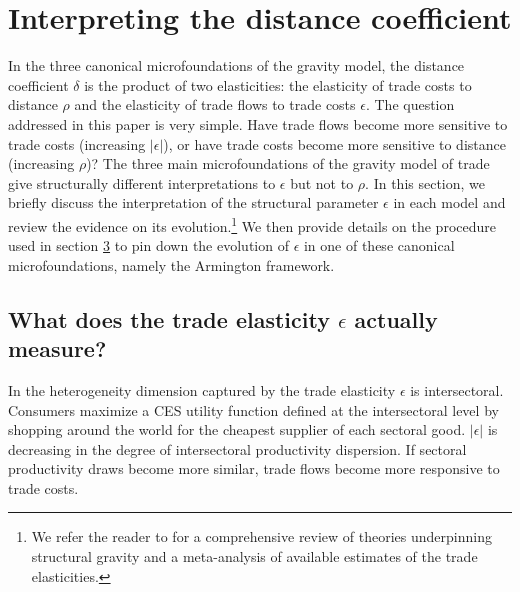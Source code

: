 \documentclass[12pt,twoside,a4paper,notitlepage]{article}
\begin{document}

\section{Interpreting the distance coefficient}
In the three canonical microfoundations of the gravity model, the distance coefficient $\delta $ is the product of two elasticities: the elasticity of trade costs to distance $ \rho $ and the elasticity of trade flows to trade costs $ \epsilon $.
The question addressed in this paper is very simple.
Have trade flows become more sensitive to trade costs (increasing $ |\epsilon| $), or have trade costs become more sensitive to distance (increasing $\rho$)? 
The three main microfoundations of the gravity model of trade give structurally different interpretations to $ \epsilon $ but not to $ \rho $. 
In this section, we briefly discuss the interpretation of the structural parameter $ \epsilon $ in each model and review the evidence on its evolution.\footnote{We refer the reader to \cite{Head2014} for a comprehensive review of theories underpinning structural gravity and a meta-analysis of available estimates of the trade elasticities.} 
We then provide details on the procedure used in section {\hyperref[ref-003]{3}} to pin down the evolution of $ \epsilon $ in one of these canonical microfoundations, namely the Armington framework. 

\subsection{What does the trade elasticity $ \epsilon $ actually measure? }

In \cite{Eaton2002} the heterogeneity dimension captured by the trade elasticity $ \epsilon $ is intersectoral.
Consumers maximize a CES utility function defined at the intersectoral level by shopping around the world for the cheapest supplier of each sectoral good. 
$|\epsilon|$  is decreasing in the degree of intersectoral productivity dispersion.
If sectoral productivity draws become more similar, trade flows become more responsive to trade costs.
\end{document}
